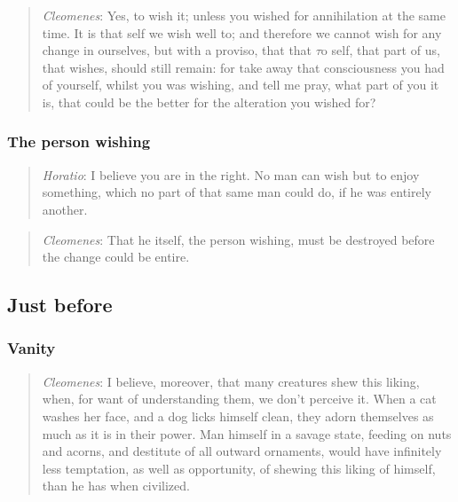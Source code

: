             \begin{quote}
                \textit{Cleomenes}: Yes, to wish it; unless you wished for annihilation at the same time. It is that self we wish well to; and therefore we cannot wish for any change in ourselves, but with a proviso, that that \(\tau\)o self, that part of us, that wishes, should still remain: for take away that consciousness you had of yourself, whilst you was wishing, and tell me pray, what part of you it is, that could be the better for the alteration you wished for?
            \end{quote}

        \subsubsection{The person wishing}

            \begin{quote}
                \textit{Horatio}: I believe you are in the right. No man can wish but to enjoy something, which no part of that same man could do, if he was entirely another.
            \end{quote}

            \begin{quote}
                \textit{Cleomenes}: That he itself, the person wishing, must be destroyed before the change could be entire.
            \end{quote}

    \subsection{Just before}

        \subsubsection{Vanity}

            \begin{quote}
                \textit{Cleomenes}: I believe, moreover, that many creatures shew this liking, when, for want of understanding them, we don’t perceive it. When a cat washes her face, and a dog licks himself clean, they adorn themselves as much as it is in their power. Man himself in a savage state, feeding on nuts and acorns, and destitute of all outward ornaments, would have infinitely less temptation, as well as opportunity, of shewing this liking of himself, than he has when civilized.
            \end{quote}

